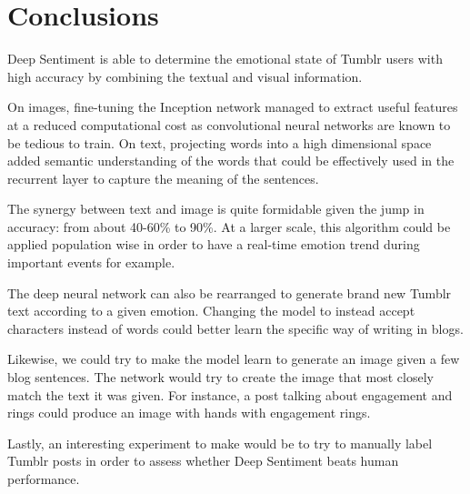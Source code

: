 \chapter{Conclusions}

Deep Sentiment is able to determine the emotional state of Tumblr users with high accuracy by combining the textual and visual information.

On images, fine-tuning the Inception network managed to extract useful features at a reduced computational cost as convolutional neural networks are known to be tedious to train. On text, projecting words into a high dimensional space added semantic understanding of the words that could be effectively used in the recurrent layer to capture the meaning of the sentences. 

The synergy between text and image is quite formidable given the jump in accuracy: from about 40-60\% to 90\%. At a larger scale, this algorithm could be applied population wise in order to have a real-time emotion trend during important events for example.

The deep neural network can also be rearranged to generate brand new Tumblr text according to a given emotion. Changing the model to instead accept characters instead of words could better learn the specific way of writing in blogs.

Likewise, we could try to make the model learn to generate an image given a few blog sentences. The network would try to create the image that most closely match the text it was given. For instance, a post talking about engagement and rings could produce an image with hands with engagement rings.

Lastly, an interesting experiment to make would be to try to manually label Tumblr posts in order to assess whether Deep Sentiment beats human performance.


